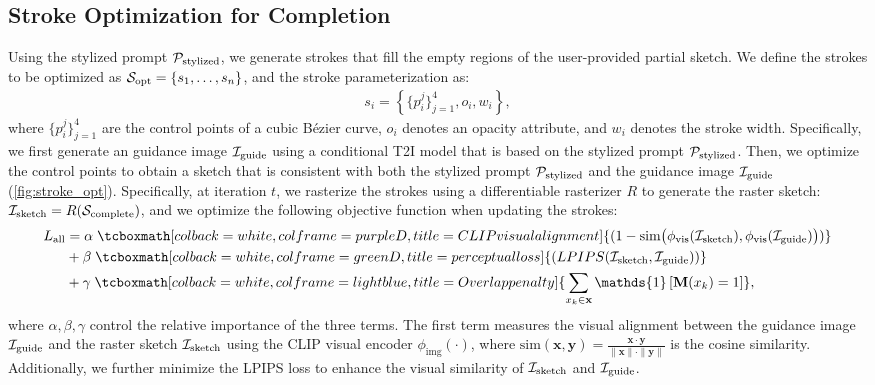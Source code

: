 \subsection{Stroke Optimization for Completion}
\label{sec:method_step2}
Using the stylized prompt $\mathcal{P}_{\mathrm{stylized}}$, we generate strokes that fill the empty regions of the user-provided partial sketch.
We define the strokes to be optimized as $\mathcal{S}_{\mathrm{opt}}=\{s_1,\dots,s_n\}$, and the stroke parameterization as:
\begin{align}
    s_i = \left\{ \{p^j_i\}_{j=1}^4,o_i, w_i \right\},
\end{align}
where $\{p^j_i\}_{j=1}^4$ are the control points of a cubic Bézier curve, $o_i$ denotes an opacity attribute, and $w_i$ denotes the stroke width.
Specifically, we first generate an guidance image $\mathcal{I}_{\mathrm{guide}}$ using a conditional T2I model that is based on the stylized prompt $\mathcal{P}_{\mathrm{stylized}}$.
Then, we optimize the control points to obtain a sketch that is consistent with both the stylized prompt $\mathcal{P}_{\mathrm{stylized}}$ and the guidance image $\mathcal{I}_{\mathrm{guide}}$ (\cref{fig:stroke_opt}).
Specifically, at iteration $t$, we rasterize the strokes using a differentiable rasterizer $R$ to generate the raster sketch: $\mathcal{I}_\mathrm{sketch} = R(\mathcal{S}_{\mathrm{complete}})$, and we optimize the following objective function when updating the strokes:
\begin{align}
    L_{\mathrm{all}}
    &= \alpha \;\tcboxmath[colback=white,colframe=purpleD,title=CLIP visual alignment]{(1 - \text{sim}\bigl(\phi_{\mathrm{vis}}(\rastersketch), \phi_{\mathrm{vis}}(\guideimg)\bigr))} \label{eq:clip_alignment}\\ 
    &+ \beta \;\tcboxmath[colback=white,colframe=greenD,title=perceptual loss]{(LPIPS(\rastersketch, \guideimg))} \label{eq:percep}\\ 
    &+ \gamma \;\tcboxmath[colback=white,colframe=lightblue,title=Overlap penalty]{\sum_{x_k \in \mathbf{x}} \mathds{1} \left[ \mathbf{M}(x_k) = 1 \right]},
    \label{eq:overlap_penalty}
\end{align}
where $\alpha,\beta,\gamma$ control the relative importance of the three terms.
The first term measures the visual alignment between the guidance image $\mathcal{I}_{\mathrm{guide}}$ and the raster sketch $\mathcal{I}_\mathrm{sketch}$ using the CLIP visual encoder $\phi_{\mathrm{img}}(\cdot)$, where $\text{sim}(\mathbf{x},\mathbf{y})=\frac{\mathbf{x}\cdot\mathbf{y}}{\|\mathbf{x}\|\cdot \|\mathbf{y}\|}$ is the cosine similarity.
Additionally, we further minimize the LPIPS loss to enhance the visual similarity of $\mathcal{I}_\mathrm{sketch}$ and $\mathcal{I}_{\mathrm{guide}}$.

